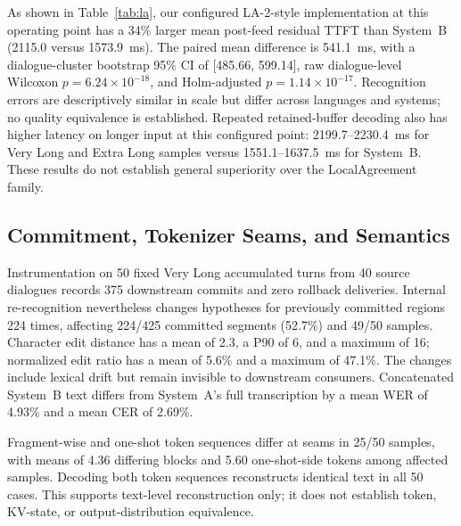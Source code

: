 \documentclass[conference]{IEEEtran}
\begin{document}
As shown in Table~\ref{tab:la}, our configured LA-2-style implementation at this operating point has a 34\% larger mean post-feed residual TTFT than System~B (2115.0 versus 1573.9~ms). The paired mean difference is 541.1~ms, with a dialogue-cluster bootstrap 95\% CI of [485.66, 599.14], raw dialogue-level Wilcoxon $p=6.24\times10^{-18}$, and Holm-adjusted $p=1.14\times10^{-17}$. Recognition errors are descriptively similar in scale but differ across languages and systems; no quality equivalence is established. Repeated retained-buffer decoding also has higher latency on longer input at this configured point: 2199.7--2230.4~ms for Very Long and Extra Long samples versus 1551.1--1637.5~ms for System~B. These results do not establish general superiority over the LocalAgreement family.

\subsection{Commitment, Tokenizer Seams, and Semantics}\label{sec:stateeval}

Instrumentation on 50 fixed Very Long accumulated turns from 40 source dialogues records 375 downstream commits and zero rollback deliveries. Internal re-recognition nevertheless changes hypotheses for previously committed regions 224 times, affecting 224/425 committed segments (52.7\%) and 49/50 samples. Character edit distance has a mean of 2.3, a P90 of 6, and a maximum of 16; normalized edit ratio has a mean of 5.6\% and a maximum of 47.1\%. The changes include lexical drift but remain invisible to downstream consumers. Concatenated System~B text differs from System~A's full transcription by a mean WER of 4.93\% and a mean CER of 2.69\%.

Fragment-wise and one-shot token sequences differ at seams in 25/50 samples, with means of 4.36 differing blocks and 5.60 one-shot-side tokens among affected samples. Decoding both token sequences reconstructs identical text in all 50 cases. This supports text-level reconstruction only; it does not establish token, KV-state, or output-distribution equivalence.
\end{document}
